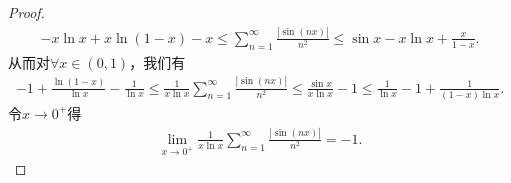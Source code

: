 \documentclass[../../main.tex]{subfiles}%
\begin{document}
\begin{proof}
\begin{align*}
-x\ln x+x\ln \left( 1-x \right)-x\leqslant \sum_{n=1}^{\infty}\frac{|\sin(nx)|}{n^2}\leqslant \sin x-x\ln x+\frac{x}{1-x}.
\end{align*}
从而对$\forall x\in (0,1)$，我们有
\begin{align*}
-1+\frac{\ln \left( 1-x \right)}{\ln x}-\frac{1}{\ln x} \leqslant \frac{1}{x\ln x}\sum_{n=1}^{\infty}\frac{|\sin(nx)|}{n^2}\leqslant \frac{\sin x}{x\ln x}-1\leqslant \frac{1}{\ln x}-1+\frac{1}{(1-x)\ln x}.
\end{align*}
令$x\rightarrow 0^+$得
\begin{align*}
\lim_{x\rightarrow 0^+}\frac{1}{x\ln x}\sum_{n=1}^{\infty}\frac{|\sin(nx)|}{n^2}=-1.
\end{align*}

\end{proof}
\end{document}
